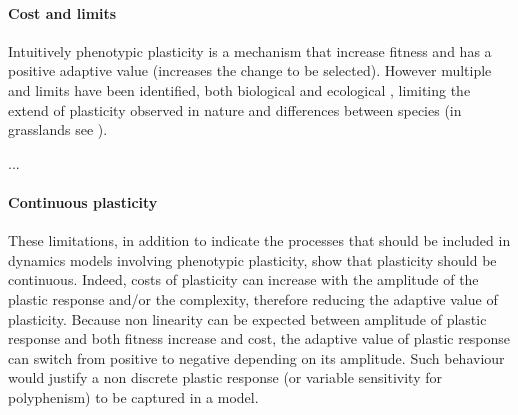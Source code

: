 

\paragraph{Cost and limits}

Intuitively phenotypic plasticity is a mechanism that increase fitness and has a positive adaptive value (increases the change to be selected). However multiple  and limits have been identified, both biological \parencite{ dewitt_cost_1998, auld_re-evaluating_2009, callahan_phenotypic_2008} and ecological \parencite{dewitt_cost_1998, auld_re-evaluating_2009, scheiner_genetics_1989, scheiner_genetics_2002 ,scheiner_genetics_2012, van_kleunen_constraints_2005}, limiting the extend of plasticity observed in nature and differences between species (in grasslands see \cite{ryser_consequences_2000}).

...



\paragraph{Continuous plasticity}
These limitations, in addition to indicate the processes that should be included in dynamics models involving phenotypic plasticity, show that plasticity should be continuous. Indeed, costs of plasticity can increase with the amplitude of the plastic response and/or the complexity, therefore reducing the adaptive value of plasticity. Because non linearity can be expected between amplitude of plastic response and both fitness increase and cost, the adaptive value of plastic response can switch from positive to negative depending on its amplitude. Such behaviour would justify a non discrete plastic response (or variable sensitivity for polyphenism) to be captured in a model.
%
%


%
%


